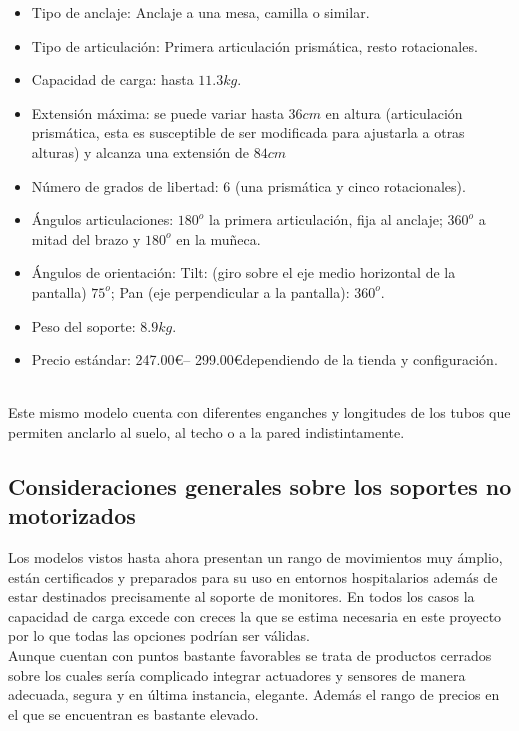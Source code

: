  \begin{minipage}{0.65\textwidth}\raggedright
 	\hspace{1cm}
 	\begin{itemize}
 		\item Tipo de anclaje: Anclaje a una mesa, camilla o similar.
 		\item Tipo de articulación: Primera articulación prismática, resto rotacionales.
 		\item Capacidad de carga: hasta $11.3kg$.
 		\item Extensión máxima: se puede variar hasta $36cm$ en altura (articulación prismática, esta es susceptible de ser modificada para ajustarla a otras alturas) y alcanza una extensión de $84cm$
 		\item Número de grados de libertad: 6 (una prismática y cinco rotacionales).
 		\item Ángulos articulaciones: $180^o$ la primera articulación, fija al anclaje; $360^o$ a mitad del brazo y $180^o$ en la muñeca.
 		\item Ángulos de orientación: Tilt: (giro sobre el eje medio horizontal de la pantalla) $75^o$; Pan (eje perpendicular a la pantalla): $360^o$.
 		\item Peso del soporte: $8.9kg$.
 		\item Precio estándar: 247.00\euro – 299.00\euro dependiendo de la tienda y configuración.
 	\end{itemize}
 \end{minipage}
 \\

 \vspace{0.1cm}
 Este mismo modelo cuenta con diferentes enganches y longitudes de los tubos que permiten anclarlo al suelo, al techo o a la pared indistintamente.

 \subsection{Consideraciones generales sobre los soportes no motorizados}
 Los modelos vistos hasta ahora presentan un rango de movimientos muy ámplio, están certificados y preparados para su uso en entornos hospitalarios además de estar destinados precisamente al soporte de monitores. En todos los casos la capacidad de carga excede con creces la que se estima necesaria en este proyecto por lo que todas las opciones podrían ser válidas.
 \\

 Aunque cuentan con puntos bastante favorables se trata de productos cerrados sobre los cuales sería complicado integrar actuadores y sensores de manera adecuada, segura y en última instancia, elegante. Además el rango de precios en el que se encuentran es bastante elevado.

